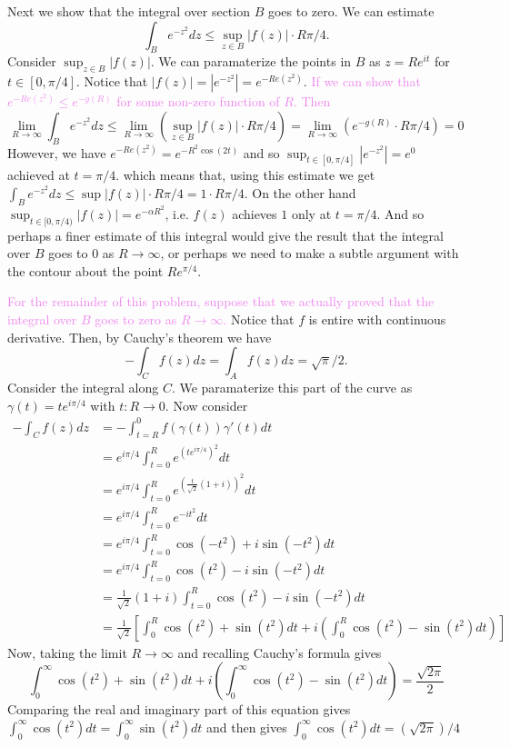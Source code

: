 \documentclass[12pt,letterpaper,boxed]{hmcpset}
\newcommand{\wg}[1]{\textcolor{violet}{#1}}
\newcommand{\abs}[1]{\left|#1\right|}
\begin{document}
\begin{solution}
Next we show that the integral over section $B$ goes to zero.
We can estimate \[
	\int_{B} e^{-z^2} dz \leq \sup_{z \in B} \abs{f(z)} \cdot R \pi/4.
\]
Consider $\sup_{z \in B} \abs{f(z)}$. 
We can paramaterize the points in $B$ as $z = Re^{it}$ for $t \in [0,
\pi/4]$. Notice that $\abs{f(z)} = \abs{e^{-z^2}} = e^{-Re(z^2)}$.
\wg{
If we can show that $e^{-Re(z^2)} \leq e^{-g(R)}$ for some non-zero function of
$R$. Then} 
\[
	\lim_{R \to \infty} \int_B e^{-z^2} dz \leq
		\lim_{R \to \infty}(\sup_{z \in B} \abs{f(z)} \cdot R \pi/4) 
		= \lim_{R \to \infty}(e^{-g(R)} \cdot R \pi/4) = 0
\]
However, we have $e^{-Re(z^2)} = e^{-R^2\cos(2t)}$ and so 
$\sup_{t \in [0, \pi/4]}\abs{e^{-z^2}} = e^{0}$ achieved at $t = \pi/4$.
which means that, using this estimate we get 
$\int_{B} e^{-z^2} dz \leq \sup \abs{f(z)} \cdot R\pi/4 = 1 \cdot
R\pi/4$.
On the other hand $\sup_{t \in [0, \pi/4)} \abs{f(z)} = e^{- \alpha
R^2}$, i.e. $f(z)$ achieves $1$ only at $t = \pi /4$. 
And so perhaps a finer estimate of this integral would give the result 
that the integral over $B$ goes to $0$ as $R \to \infty$, or perhaps 
we need to make a subtle argument with the contour about the point
$Re^{\pi/4}$.


\wg{For the remainder of this problem, suppose that we actually
proved that the integral over $B$ goes to zero as $R \to \infty$.}
Notice that $f$ is entire with continuous derivative. Then, by Cauchy's
theorem we have \[
	-\int_{C} f(z) dz = \int_A f(z) dz = \sqrt\pi / 2. 
\]
Consider the integral along $C$. We paramaterize this part of the
curve as $\gamma(t) = t e^{i \pi /4}$ with $t: R \to 0$.
Now consider
\begin{align*}
	-\int_C f(z) dz 
	&= -\int_{t=R}^0 f(\gamma(t)) \gamma'(t) dt \\ 
	&= e^{i\pi/4}\int_{t=0}^R e^{(t e^{i\pi/4})^2} dt \\
	&= e^{i\pi/4}\int_{t=0}^R e^{(\frac{t}{\sqrt 2} (1 + i))^2} dt \\
	&= e^{i\pi/4}\int_{t=0}^R e^{-it^2} dt \\
	&= e^{i\pi/4}\int_{t=0}^R \cos(-t^2) + i \sin(-t^2) dt \\
	&= e^{i\pi/4}\int_{t=0}^R \cos(t^2) - i \sin(-t^2) dt \\
	&= \frac{1}{\sqrt 2}(1 + i )\int_{t=0}^R \cos(t^2) - i \sin(-t^2) dt \\
	&= \frac{1}{\sqrt 2} \left[
		\int_0^R \cos(t^2) + \sin(t^2) dt 
		+ i\left(\int_0^R \cos(t^2) - \sin(t^2) dt \right)
	\right]	
\end{align*}
Now, taking the limit $R \to \infty$ and recalling Cauchy's formula
gives 
\[
	\int_0^\infty \cos(t^2) + \sin(t^2) dt 
	+ i\left(\int_0^\infty \cos(t^2) - \sin(t^2) dt \right)
	= \frac{\sqrt{2 \pi}}{2}
\]
Comparing the real and imaginary part of this equation gives
$\int_0^\infty \cos(t^2) dt = \int_0^\infty \sin(t^2) dt$ 
and then gives $\int_0^\infty \cos(t^2) dt = (\sqrt{2\pi})/4$




\end{solution}
\end{document}
